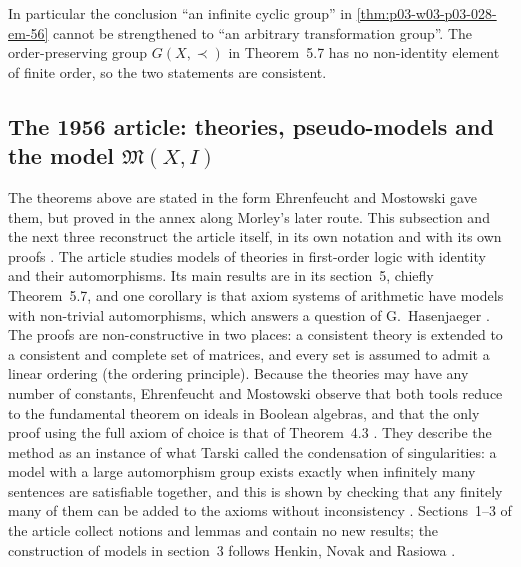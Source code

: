 In particular the conclusion ``an infinite cyclic group'' in
\cref{thm:p03-w03-p03-028-em-56} cannot be strengthened to ``an arbitrary
transformation group''.  The order-preserving group \(G(X,\prec)\) in
Theorem~5.7 has no non-identity element of finite order, so the two
statements are consistent.

\subsection{The 1956 article: theories, pseudo-models and the model \texorpdfstring{\(\mathfrak M(X,I)\)}{M(X,I)}}
\label{sec:p03-w03-p03-028-em1956}

The theorems above are stated in the form Ehrenfeucht and Mostowski gave
them, but proved in the annex along Morley's later route.  This subsection
and the next three reconstruct the article itself, in its own notation and
with its own proofs \cite[pp.~50--68]{EhrenfeuchtMostowski1956}.  The article
studies models of theories in first-order logic with identity and their
automorphisms.  Its main results are in its section~5, chiefly Theorem~5.7,
and one corollary is that axiom systems of arithmetic have models with
non-trivial automorphisms, which answers a question of G.~Hasenjaeger
\cite[p.~50]{EhrenfeuchtMostowski1956}.  The proofs are non-constructive in
two places: a consistent theory is extended to a consistent and complete set
of matrices, and every set is assumed to admit a linear ordering (the
ordering principle).  Because the theories may have any number of constants,
Ehrenfeucht and Mostowski observe that both tools reduce to the fundamental
theorem on ideals in Boolean algebras, and that the only proof using the full
axiom of choice is that of Theorem~4.3
\cite[pp.~50--51]{EhrenfeuchtMostowski1956}.  They describe the method as an
instance of what Tarski called the condensation of singularities: a model
with a large automorphism group exists exactly when infinitely many
sentences are satisfiable together, and this is shown by checking that any
finitely many of them can be added to the axioms without inconsistency
\cite[p.~50]{EhrenfeuchtMostowski1956}.  Sections~1--3 of the article
collect notions and lemmas and contain no new results; the construction of
models in section~3 follows Henkin, Novak and Rasiowa
\cite[p.~51]{EhrenfeuchtMostowski1956}.

